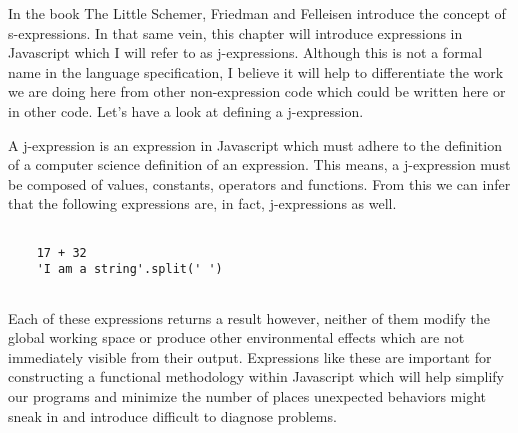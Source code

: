 \documentclass[a4paper,12pt,twoside]{book}
\begin{document}
 In the book The Little Schemer, Friedman and Felleisen introduce the concept of s-expressions.  In that same vein, this chapter will introduce expressions in Javascript which I will refer to as j-expressions.  Although this is not a formal name in the language specification, I believe it will help to differentiate the work we are doing here from other non-expression code which could be written here or in other code. Let's have a look at defining a j-expression. 
 
 A j-expression is an expression in Javascript which must adhere to the definition of a computer science definition of an expression.  This means, a j-expression must be composed of values, constants, operators and functions. From this we can infer that the following expressions are, in fact, j-expressions as well.
 
 \begin{lstlisting}
 
 	17 + 32
 	'I am a string'.split(' ')
 	
 \end{lstlisting}
 
 Each of these expressions returns a result however, neither of them modify the global working space or produce other environmental effects which are not immediately visible from their output.  Expressions like these are important for constructing a functional methodology within Javascript which will help simplify our programs and minimize the number of places unexpected behaviors might sneak in and introduce difficult to diagnose problems.
 
 
 
\end{document}
